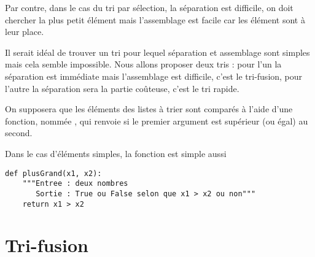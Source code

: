 Par contre, dans le cas du tri par sélection, la séparation est difficile, on doit chercher la plus petit élément mais l'assemblage est facile car les élément sont à leur place.


Il serait idéal de trouver un tri pour lequel séparation et assemblage sont simples mais cela semble impossible. Nous allons proposer deux tris : pour l'un la séparation est immédiate mais l'assemblage est difficile, c'est le tri-fusion,  pour l'autre la séparation sera la partie coûteuse, c'est le tri rapide.
\begin{center}
\end{center}


\medskip

On supposera que les éléments des listes à trier sont comparés à l'aide d'une fonction, nommée , qui renvoie  si le premier argument est supérieur (ou égal) au second.

Dans le cas d'éléments simples, la fonction  est simple aussi
\begin{lstlisting}
def plusGrand(x1, x2):
    """Entree : deux nombres
       Sortie : True ou False selon que x1 > x2 ou non"""
    return x1 > x2
\end{lstlisting}
\newpage
\section{Tri-fusion}
